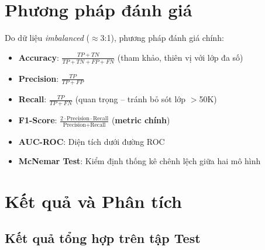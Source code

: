 \documentclass[12pt, a4paper]{article}
\begin{document}
\section{Phương pháp đánh giá}
\label{sec:evaluation}

Do dữ liệu \emph{imbalanced} ($\approx$3:1), phương pháp đánh giá chính:

\begin{itemize}
  \item \textbf{Accuracy}: $\frac{TP+TN}{TP+TN+FP+FN}$ (tham khảo, thiên vị với lớp đa số)
  \item \textbf{Precision}: $\frac{TP}{TP+FP}$
  \item \textbf{Recall}: $\frac{TP}{TP+FN}$ (quan trọng -- tránh bỏ sót lớp $>$50K)
  \item \textbf{F1-Score}: $\frac{2\cdot\text{Precision}\cdot\text{Recall}}{\text{Precision}+\text{Recall}}$ (\textbf{metric chính})
  \item \textbf{AUC-ROC}: Diện tích dưới đường ROC
  \item \textbf{McNemar Test}: Kiểm định thống kê chênh lệch giữa hai mô hình
\end{itemize}

\section{Kết quả và Phân tích}
\label{sec:results}

\subsection{Kết quả tổng hợp trên tập Test}
\end{document}
